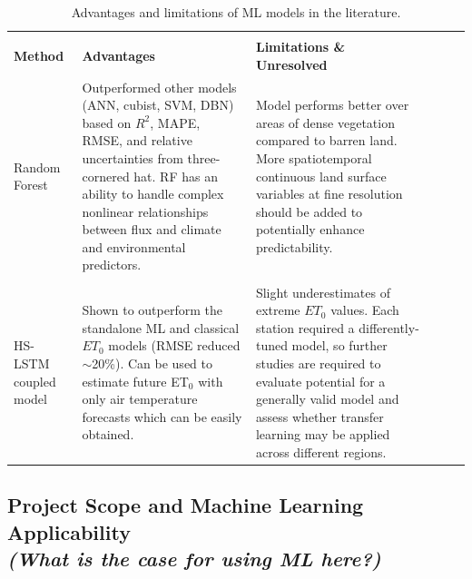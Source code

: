 \documentclass[paper=a4, fontsize=12pt]{scrartcl}
\begin{document}
	\begin{table}[H]
		\centering
		\caption{Advantages and limitations of ML models in the literature.}
		\label{tab:ml_models}
		\begin{tabularx}{\textwidth}{X*{5}{>{\arraybackslash}X}} 
			\hline \hline \\
			\textbf{Method} & \textbf{Advantages} & \textbf{Limitations \& Unresolved} \\
			
			Random Forest \citep{xu2018evaluating} & Outperformed other models (ANN, cubist, SVM, DBN) based on $R^2$, MAPE, RMSE, and relative uncertainties from three-cornered hat. \newline \newline RF  has an ability to handle complex nonlinear relationships between flux and climate and environmental predictors. & Model performs better over areas of dense vegetation compared to barren land. \newline \newline More spatiotemporal continuous land surface variables at fine resolution should be added to potentially enhance predictability.\\
			
			\hline
			\\
			
			HS-LSTM coupled model \citep{yan2023deep} & Shown to outperform the standalone ML and classical $ET_0$ models (RMSE reduced $\sim$20\%). \newline\newline Can be used to estimate future ET$_0$ with only air temperature forecasts which can be easily obtained. & Slight underestimates of extreme $ET_0$ values. \newline\newline Each station required a differently-tuned model, so further studies are required to evaluate potential for a generally valid model and assess whether transfer learning may be applied across different regions. \\
			
			\hline
		\end{tabularx} 
	\end{table}

	\newpage
	\subsection{Project Scope and Machine Learning Applicability\\ \textit{(What is the case for using ML here?)}}
\end{document}

